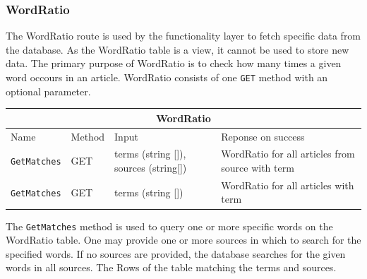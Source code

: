 \subsubsection{WordRatio}
The WordRatio route is used by the functionality layer to fetch specific data from the database.
As the WordRatio table is a view, it cannot be used to store new data. 
The primary purpose of WordRatio is to check how many times a given word occours in an article.
WordRatio consists of one \texttt{GET} method with an optional parameter. 
\begin{table}[h]
    \begin{tabular}{|llll|}
    \hline
    \multicolumn{4}{|c|}{\textbf{WordRatio}}                                                                                                                                           \\ \hline
    \multicolumn{1}{|l|}{Name}                      & \multicolumn{1}{l|}{Method} & \multicolumn{1}{l|}{Input}                           & Reponse on success                               \\ \hline
    \multicolumn{1}{|l|}{\texttt{GetMatches}}       & \multicolumn{1}{l|}{GET}    & \multicolumn{1}{l|}{terms (string []), sources (string[])} & WordRatio for all articles from source with term \\ \hline
    \multicolumn{1}{|l|}{\texttt{GetMatches}}       & \multicolumn{1}{l|}{GET}    & \multicolumn{1}{l|}{terms (string [])}                   & WordRatio for all articles with term             \\ \hline
    \end{tabular}
    \end{table}
The \texttt{GetMatches} method is used to query one or more specific words on the WordRatio table.
One may provide one or more sources in which to search for the specified words.
If no sources are provided, the database searches for the given words in all sources.
The Rows of the table matching the terms and sources.

